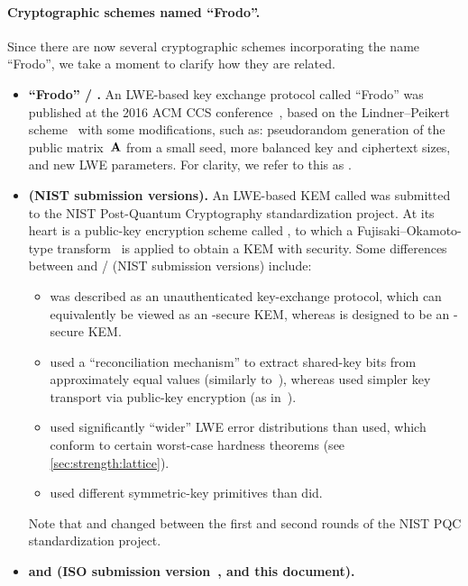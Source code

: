 \paragraph{Cryptographic schemes named ``Frodo''.}

Since there are now several cryptographic schemes incorporating the name ``Frodo'', we take a moment to clarify how they are related.

\begin{itemize}
\item \textbf{``Frodo'' / \FrodoCCS.}
  An LWE-based key exchange protocol called ``Frodo'' was published at the 2016 ACM CCS conference~\cite{CCS:BCDMNN16}, based on the Lindner--Peikert scheme~\cite{RSA:LinPei11} with some modifications, such as: pseudorandom generation of the public matrix~$\mathbf{A}$ from a small seed, more balanced key and ciphertext sizes, and new LWE parameters.
  For clarity, we refer to this as \FrodoCCS.
\item \textbf{\FrodoKEM (NIST submission versions).}
  An LWE-based KEM called \FrodoKEM was submitted to the NIST Post-Quantum Cryptography standardization project.
  At its heart is a public-key encryption scheme called \FrodoPKE, to which a Fujisaki--Okamoto-type transform~\cite{PKC:FujOka99} is applied to obtain a KEM with \INDCCA security.
  Some differences between \FrodoCCS and \FrodoKEM / \FrodoPKE (NIST submission versions) include:
  \begin{itemize}
  \item \FrodoCCS was described as an unauthenticated key-exchange protocol, which can equivalently be viewed as an \INDCPA-secure KEM, whereas \FrodoKEM is designed to be an \INDCCA-secure KEM.
  \item \FrodoCCS used a ``reconciliation mechanism'' to extract shared-key bits from approximately equal values (similarly to~\cite{EPRINT:DinXieLin12,PQCRYPTO:Peikert14,SP:BCNS15,USENIX:ADPS16}), whereas \FrodoKEM used simpler key transport via public-key encryption (as in~\cite{Reg09,RSA:LinPei11}).
  \item \FrodoKEM used significantly ``wider'' LWE error distributions than \FrodoCCS used, which conform to certain worst-case hardness theorems (see \autoref{sec:strength:lattice}).
  \item \FrodoKEM used different symmetric-key primitives than \FrodoCCS did.
  \end{itemize}
  Note that \FrodoPKE and \FrodoKEM changed between the first and second rounds of the NIST PQC standardization project.
\item \textbf{\FrodoKEM and \eFrodoKEM (ISO submission version~\cite{ISOdraft}, and this document).}

\end{itemize}
